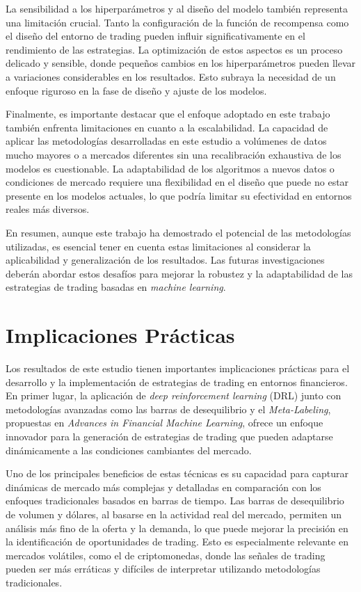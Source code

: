 \documentclass[a4paper,12pt, twoside]{report}
\begin{document}
La sensibilidad a los hiperparámetros y al diseño del modelo también representa una 
limitación crucial. Tanto la configuración de la función de recompensa como el diseño
 del entorno de trading pueden influir significativamente en el rendimiento de las 
 estrategias. La optimización de estos aspectos es un proceso delicado y sensible, 
 donde pequeños cambios en los hiperparámetros pueden llevar a variaciones considerables 
 en los resultados. Esto subraya la necesidad de un enfoque riguroso en la fase de diseño
  y ajuste de los modelos.

Finalmente, es importante destacar que el enfoque adoptado en este trabajo también enfrenta 
limitaciones en cuanto a la escalabilidad. La capacidad de aplicar las metodologías 
desarrolladas en este estudio a volúmenes de datos mucho mayores o a mercados diferentes 
sin una recalibración exhaustiva de los modelos es cuestionable. La adaptabilidad de los 
algoritmos a nuevos datos o condiciones de mercado requiere una flexibilidad en el diseño 
que puede no estar presente en los modelos actuales, lo que podría limitar su efectividad 
en entornos reales más diversos.

En resumen, aunque este trabajo ha demostrado el potencial de las metodologías utilizadas, 
es esencial tener en cuenta estas limitaciones al considerar la aplicabilidad y 
generalización de los resultados. Las futuras investigaciones deberán abordar estos 
desafíos para mejorar la robustez y la adaptabilidad de las estrategias de trading basadas 
en \textit{machine learning}.



\section{Implicaciones Prácticas}

Los resultados de este estudio tienen importantes implicaciones prácticas para el desarrollo 
y la implementación de estrategias de trading en entornos financieros. En primer lugar, la 
aplicación de \textit{deep reinforcement learning} (DRL) junto con metodologías avanzadas 
como las barras de desequilibrio y el \textit{Meta-Labeling}, propuestas en \textit{Advances 
in Financial Machine Learning}, ofrece un enfoque innovador para la generación de estrategias de trading que pueden adaptarse dinámicamente a las condiciones cambiantes del mercado.

Uno de los principales beneficios de estas técnicas es su capacidad para capturar dinámicas 
de mercado más complejas y detalladas en comparación con los enfoques tradicionales basados 
en barras de tiempo. Las barras de desequilibrio de volumen y dólares, al basarse en la actividad 
real del mercado, permiten un análisis más fino de la oferta y la demanda, lo que puede mejorar 
la precisión en la identificación de oportunidades de trading. Esto es especialmente relevante 
en mercados volátiles, como el de criptomonedas, donde las señales de trading pueden ser más 
erráticas y difíciles de interpretar utilizando metodologías tradicionales.
\end{document}
